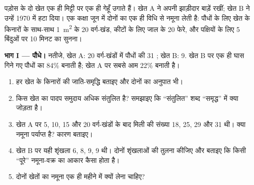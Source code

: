 \begin{problem}[{सप्ताहांत समस्या --- दो खेतों का क्षेत्र-सर्वेक्षण, एक
बाड़ों वाला और एक बिना बाड़ का: जातियाँ गिनी गईं, बहुलताएँ तुलनाई गईं,
एक घोंघे के युग्मविकल्पी पीछा किए गए, और वह संख्या जिसके बराबर कोई बाड़ है}]
\label{pb:g10:biodiversity-scales:1}
पड़ोस के दो खेत एक ही मिट्टी पर एक ही गेहूँ उगाते हैं। खेत A ने अपनी
झाड़ीदार बाड़ें रखीं; खेत B ने उन्हें 1970 में हटा दिया। एक कक्षा जून में
दोनों का एक ही विधि से नमूना लेती है: पौधों के लिए खेत के किनारों के
साथ-साथ \qty{1}{m^2} के 20 वर्ग-खंड, कीटों के लिए जाल के 20 फेरे, और
पक्षियों के लिए 5 बिंदुओं पर 10 मिनट का सुनना।

\medskip
\noindent\textbf{भाग I --- पौधे।}
नतीजे, खेत A: 20 वर्ग-खंडों में पौधों की 31 ; खेत B: 9.
खेत B पर एक ही घास गिने गए पौधों का 84\% बनाती है; खेत A पर सबसे आम
 22\% बनाती है।
\begin{enumerate}
  \item हर खेत के किनारों की जाति-समृद्धि बताइए और दोनों का अनुपात
        भी।
  \item किस खेत का पादप समुदाय अधिक संतुलित है? समझाइए कि
        ``संतुलित'' शब्द ``समृद्ध'' में क्या जोड़ता है।
  \item खेत A पर 5, 10, 15 और 20 वर्ग-खंडों के बाद मिली  की
        संख्या 18, 25, 29 और 31 थी। क्या नमूना पर्याप्त है? कारण
        बताइए।
  \item खेत B पर यही शृंखला 6, 8, 9, 9 थी। दोनों शृंखलाओं की तुलना
        कीजिए और बताइए कि किसी ``पूरे'' नमूना-वक्र का आकार कैसा होता है।
  \item दोनों खेतों का नमूना एक ही महीने में क्यों लेना चाहिए?
\end{enumerate}


\end{problem}
